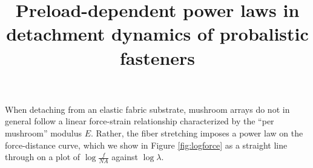 \documentclass{article}
\begin{document}
\title{Preload-dependent power laws in detachment dynamics of probalistic fasteners}

When detaching from an elastic fabric substrate, mushroom arrays do not in general
follow a linear force-strain relationship characterized by the ``per mushroom'' modulus $E$.
Rather, the fiber stretching imposes a power law on the force-distance curve, which
we show in Figure \ref{fig:logforce} as a straight line through on a plot of $\log \frac{f}{NA}$
against $\log \lambda$.
\end{document}
